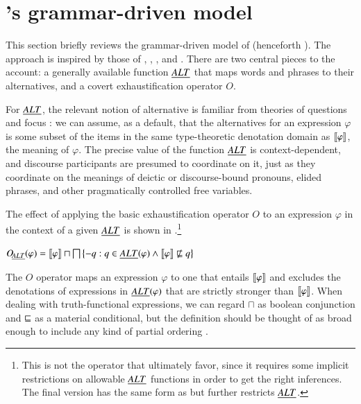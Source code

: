 \documentclass[leqno,12pt]{article}
\begin{document}

\section{\CFS's grammar-driven model}\label{sec:cfs}

This section briefly reviews the grammar-driven model of
\citet{ChierchiaFoxSpector08} (henceforth \CFS).  The approach is
inspired by those of \citet{Chierchia01}, \citet{Sauerland01},
\citet{Spector:2007}, and \citet{Fox:2007,Fox:2009}. There are two
central pieces to the account: a generally available function $\emph{ALT}$
that maps words and phrases to their alternatives, and a covert
exhaustification operator $O$.

For $\emph{ALT}$, the relevant notion of alternative is familiar from
theories of questions and focus \citep{Groenendijk84,Rooth85,Rooth92}:
we can assume, as a default, that the alternatives for an expression
$\varphi$ is some subset of the items in the same type-theoretic
denotation domain as $\llbracket\varphi\rrbracket$, the meaning of $\varphi$.  The
precise value of the function $\emph{ALT}$ is context-dependent, and
discourse participants are presumed to coordinate on it, just as they
coordinate on the meanings of deictic or discourse-bound pronouns,
elided phrases, and other pragmatically controlled free variables.

The effect of applying the basic exhaustification operator $O$ to an
expression $\varphi$ in the context of a given $\emph{ALT}$ is shown in
\citep{Spector:2007,Fox:2007,Fox:2009,Magri:2009,ChierchiaFoxSpector08}.\footnote{This
  is not the operator that \CFS ultimately favor, since it
  requires some implicit restrictions on allowable $\emph{ALT}$ functions in
  order to get the right inferences.  The final version has the same
  form as  but further restricts $\emph{ALT}$.}
%
\begin{examples}
\item\label{def:O}
  $\OALT(\varphi) = 
  \sem{\varphi} \sqcap \bigsqcap\set{ -q : q \in \ALT(\varphi) \wedge \sem{\varphi} \not\entails q}$ 
\end{examples}
%
The $O$ operator maps an expression $\varphi$ to one that entails
$\llbracket\varphi\rrbracket$ and excludes the denotations of expressions in
$\emph{ALT}(\varphi)$ that are strictly stronger than $\llbracket\varphi\rrbracket$. When
dealing with truth-functional expressions, we can regard $\sqcap$ as
boolean conjunction and $\sqsubseteq$ as a material conditional, but the
definition should be thought of as broad enough to include any kind of
partial ordering .
\end{document}

